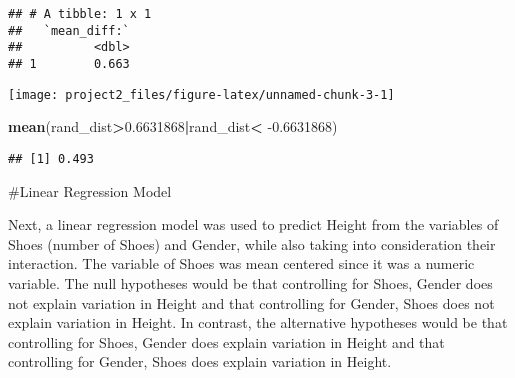 \documentclass[]{article}
\newenvironment{Shaded}{\begin{snugshade}}{\end{snugshade}}
\newcommand{\ControlFlowTok}[1]{\textcolor[rgb]{0.13,0.29,0.53}{\textbf{#1}}}
\newcommand{\DataTypeTok}[1]{\textcolor[rgb]{0.13,0.29,0.53}{#1}}
\newcommand{\DecValTok}[1]{\textcolor[rgb]{0.00,0.00,0.81}{#1}}
\newcommand{\FloatTok}[1]{\textcolor[rgb]{0.00,0.00,0.81}{#1}}
\newcommand{\KeywordTok}[1]{\textcolor[rgb]{0.13,0.29,0.53}{\textbf{#1}}}
\newcommand{\NormalTok}[1]{#1}
\newcommand{\OperatorTok}[1]{\textcolor[rgb]{0.81,0.36,0.00}{\textbf{#1}}}
\newcommand{\StringTok}[1]{\textcolor[rgb]{0.31,0.60,0.02}{#1}}
\begin{document}
\begin{verbatim}
## # A tibble: 1 x 1
##   `mean_diff:`
##          <dbl>
## 1        0.663
\end{verbatim}

\begin{Shaded}
\end{Shaded}

\begin{center}\texttt{[image: project2\_files/figure-latex/unnamed-chunk-3-1]} \end{center}

\begin{Shaded}
\begin{Highlighting}[]
\KeywordTok{mean}\NormalTok{(rand_dist}\OperatorTok{>}\FloatTok{0.6631868}\OperatorTok{|}\NormalTok{rand_dist}\OperatorTok{<}\StringTok{ }\FloatTok{-0.6631868}\NormalTok{)}
\end{Highlighting}
\end{Shaded}

\begin{verbatim}
## [1] 0.493
\end{verbatim}

\#Linear Regression Model

Next, a linear regression model was used to predict Height from the
variables of Shoes (number of Shoes) and Gender, while also taking into
consideration their interaction. The variable of Shoes was mean centered
since it was a numeric variable. The null hypotheses would be that
controlling for Shoes, Gender does not explain variation in Height and
that controlling for Gender, Shoes does not explain variation in Height.
In contrast, the alternative hypotheses would be that controlling for
Shoes, Gender does explain variation in Height and that controlling for
Gender, Shoes does explain variation in Height.
\end{document}
